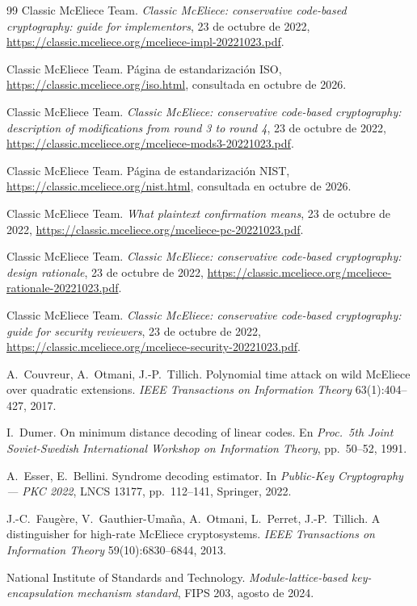 \documentclass[11pt,a4paper,oneside]{report}
\begin{document}
\begin{thebibliography}{99}
Classic McEliece Team. \emph{Classic McEliece: conservative
code-based cryptography: guide for implementors}, 23 de octubre de
2022,
\url{https://classic.mceliece.org/mceliece-impl-20221023.pdf}.

Classic McEliece Team. P\'agina de estandarizaci\'on ISO,
\url{https://classic.mceliece.org/iso.html}, consultada en octubre de
2026.

Classic McEliece Team. \emph{Classic McEliece: conservative
code-based cryptography: description of modifications from round 3
to round 4}, 23 de octubre de 2022,
\url{https://classic.mceliece.org/mceliece-mods3-20221023.pdf}.

Classic McEliece Team. P\'agina de estandarizaci\'on NIST,
\url{https://classic.mceliece.org/nist.html}, consultada en octubre de
2026.

Classic McEliece Team. \emph{What plaintext confirmation means},
23 de octubre de 2022,
\url{https://classic.mceliece.org/mceliece-pc-20221023.pdf}.

Classic McEliece Team. \emph{Classic McEliece: conservative
code-based cryptography: design rationale}, 23 de octubre de 2022,
\url{https://classic.mceliece.org/mceliece-rationale-20221023.pdf}.

Classic McEliece Team. \emph{Classic McEliece: conservative
code-based cryptography: guide for security reviewers}, 23 de
octubre de 2022,
\url{https://classic.mceliece.org/mceliece-security-20221023.pdf}.

A.~Couvreur, A.~Otmani, J.-P.~Tillich. Polynomial time attack on
wild McEliece over quadratic extensions. \emph{IEEE Transactions on
Information Theory} 63(1):404--427, 2017.

I.~Dumer. On minimum distance decoding of linear codes. En
\emph{Proc.\ 5th Joint Soviet-Swedish International Workshop on
Information Theory}, pp.~50--52, 1991.

A.~Esser, E.~Bellini. Syndrome decoding estimator. In
\emph{Public-Key Cryptography --- PKC 2022}, LNCS 13177,
pp.~112--141, Springer, 2022.

J.-C.~Faug\`ere, V.~Gauthier-Uma\~na, A.~Otmani, L.~Perret,
J.-P.~Tillich. A distinguisher for high-rate McEliece cryptosystems.
\emph{IEEE Transactions on Information Theory} 59(10):6830--6844,
2013.

National Institute of Standards and Technology. \emph{Module-lattice-based
key-encapsulation mechanism standard}, FIPS 203, agosto de 2024.


\end{thebibliography}
\end{document}
